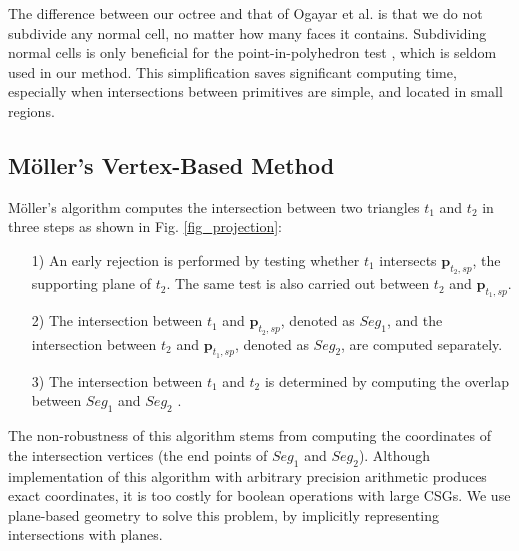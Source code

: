 
The difference between our octree and that of Ogayar et al. is that we do not subdivide any normal cell, no matter how many faces it contains. Subdividing normal cells is only beneficial for the point-in-polyhedron test \cite{frisken2002simple}, which is seldom used in our method. This simplification saves significant computing time, especially when intersections between primitives are simple, and located in small regions.


\subsection{M\"{o}ller's Vertex-Based Method}



M\"{o}ller's algorithm computes the intersection between two triangles $t_1$ and $t_2$ in three steps as shown in Fig. \ref{fig_projection}:
\begin{itemize}[leftmargin=0.45cm]
\item[1)] An early rejection is performed by testing whether $t_1$ intersects $\bm{p}_{t_2, sp}$, the supporting plane of $t_2$. The same test is also carried out between $t_2$ and $\bm{p}_{t_1, sp}$.
\item[2)]The intersection between $t_1$ and $\bm{p}_{t_2, sp}$, denoted as $Seg_1$, and the intersection between $t_2$ and $\bm{p}_{t_1, sp}$, denoted as $Seg_2$, are computed separately.
 \item[3)]The intersection between $t_1$ and $t_2$ is determined by computing the overlap between $Seg_1$ and $Seg_2$ .
\end{itemize}




The non-robustness of this algorithm stems from computing the coordinates of the intersection vertices (the end points of $Seg_1$ and $Seg_2$). Although implementation of this algorithm with arbitrary precision arithmetic produces exact coordinates, it is too costly for boolean operations with large CSGs. We use plane-based geometry to solve this problem, by implicitly representing intersections with planes.

